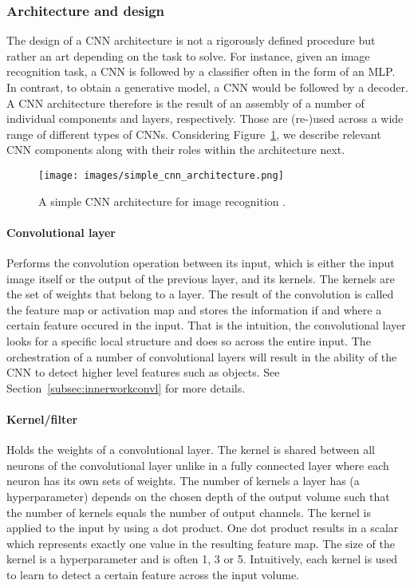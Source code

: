 \documentclass[12pt,a4paper]{article}
\begin{document}
\subsubsection{Architecture and design}
The design of a CNN architecture is not a rigorously defined procedure but rather an art depending on the task to solve. For instance, given an image recognition task, a CNN is followed by a classifier often in the form of an MLP. In contrast, to obtain a generative model, a CNN would be followed by a decoder. A CNN architecture therefore is the result of an assembly of a number of individual components and layers, respectively. Those are (re-)used across a wide range of different types of CNNs. Considering Figure~\ref{fig:simple_cnn_arch}, we describe relevant CNN components along with their roles within the architecture  next. 
\begin{figure}[H]
\centering
\texttt{[image: images/simple\_cnn\_architecture.png]}
\caption{A simple CNN architecture for image recognition \cite{cnn_arch_article}.}
\label{fig:simple_cnn_arch}
\end{figure}

\paragraph{Convolutional layer} Performs the convolution operation between its input, which is either the input image itself or the output of the previous layer, and its kernels. The kernels are the set of weights that belong to a layer. The result of the convolution is called the feature map or activation map and stores the information if and where a certain feature occured in the input. That is the intuition, the convolutional layer looks for a specific local structure and does so across the entire input. The orchestration of a number of convolutional layers will result in the ability of the CNN to detect higher level features such as objects. See Section~\ref{subsec:innerworkconvl} for more details.

\paragraph{Kernel/filter            } Holds the weights of a convolutional layer. The kernel is shared between all neurons of the convolutional layer unlike in a fully connected layer where each neuron has its own sets of weights. The number of kernels a layer has (a hyperparameter) depends on the chosen depth of the output volume such that the number of kernels equals the number of output channels. The kernel is applied to the input by using a dot product. One dot product results in a scalar which represents exactly one value in the resulting feature map. The size of the kernel is a hyperparameter and is often 1, 3 or 5. Intuitively, each kernel is used to learn to detect a certain feature across the input volume.
\end{document}
